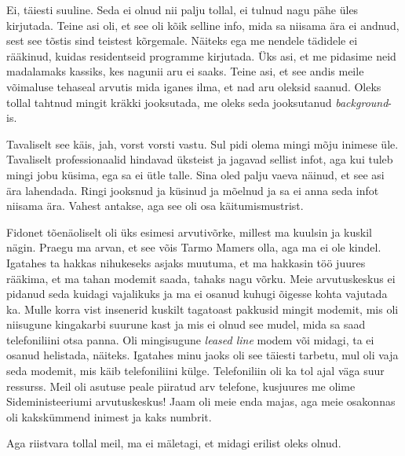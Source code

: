 
Ei, täiesti suuline. Seda ei olnud nii palju tollal, ei tulnud nagu pähe üles kirjutada. Teine asi oli, et see oli kõik selline info,  mida sa niisama ära ei andnud, sest see tõstis sind teistest kõrgemale. Näiteks ega me nendele tädidele ei rääkinud, kuidas residentseid programme kirjutada. Üks asi, et me pidasime neid madalamaks kassiks, kes nagunii aru ei saaks. Teine asi, et see andis meile võimaluse tehaseal arvutis  mida iganes ilma, et nad aru oleksid saanud. Oleks tollal tahtnud mingit kräkki jooksutada, me oleks seda jooksutanud \emph{background}-is.


Tavaliselt see käis, jah, vorst vorsti vastu.  Sul pidi olema mingi mõju inimese üle. Tavaliselt professionaalid hindavad üksteist ja jagavad sellist infot, aga kui tuleb mingi jobu küsima, ega sa ei ütle talle. Sina oled palju vaeva näinud, et see asi ära lahendada. Ringi jooksnud ja küsinud ja mõelnud ja sa ei anna seda infot niisama ära. Vahest antakse, aga see oli osa käitumismustrist. 

Fidonet tõenäoliselt oli üks esimesi arvutivõrke, millest ma kuulsin ja kuskil nägin. Praegu ma arvan, et see võis Tarmo Mamers olla, aga ma ei ole kindel. Igatahes ta hakkas nihukeseks asjaks muutuma, et ma hakkasin töö juures rääkima, et ma tahan modemit saada, tahaks nagu võrku. Meie arvutuskeskus ei pidanud seda kuidagi vajalikuks ja ma ei osanud  kuhugi õigesse kohta vajutada ka. Mulle korra vist insenerid kuskilt tagatoast pakkusid mingit modemit, mis oli niisugune kingakarbi suurune kast ja mis ei olnud see mudel, mida sa saad telefoniliini otsa panna. Oli mingisugune \emph{leased line} modem või midagi, ta ei osanud helistada, näiteks. Igatahes minu jaoks oli see täiesti tarbetu,  mul oli vaja seda modemit, mis käib telefoniliini külge. Telefoniliin oli ka tol ajal väga suur ressurss. Meil oli asutuse peale piiratud arv telefone, kusjuures me olime Sideministeeriumi arvutuskeskus! Jaam oli meie enda majas, aga meie osakonnas oli kakskümmend inimest ja kaks numbrit. 


Aga riistvara tollal meil, ma ei mäletagi, et midagi erilist oleks olnud.

